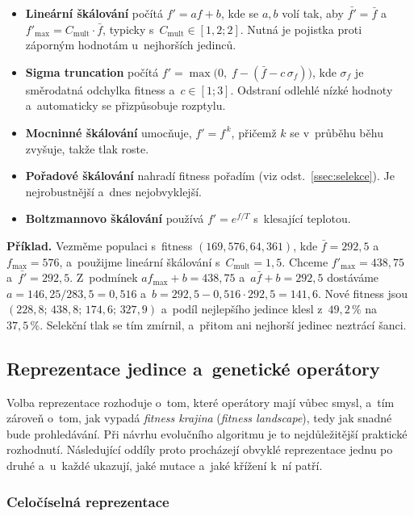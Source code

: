 \documentclass[11pt,a4paper]{article}
\theoremstyle{definition}
\begin{document}
\begin{itemize}
\item \textbf{Lineární škálování} počítá $f' = a f + b$, kde se $a, b$ volí tak,
  aby $\bar{f'} = \bar{f}$ a~$f'_{\max} = C_{\mathrm{mult}} \cdot \bar{f}$,
  typicky s~$C_{\mathrm{mult}} \in [1{,}2; 2]$. Nutná je pojistka proti záporným
  hodnotám u~nejhorších jedinců.
\item \textbf{Sigma truncation} počítá $f' = \max\big(0,\; f - (\bar f - c\,\sigma_f)\big)$,
  kde $\sigma_f$ je směrodatná odchylka fitness a~$c \in [1;3]$. Odstraní
  odlehlé nízké hodnoty a~automaticky se přizpůsobuje rozptylu.
\item \textbf{Mocninné škálování} umocňuje, $f' = f^{\,k}$, přičemž $k$ se
  v~průběhu běhu zvyšuje, takže tlak roste.
\item \textbf{Pořadové škálování} nahradí fitness pořadím (viz
  odst.~\ref{ssec:selekce}). Je nejrobustnější a~dnes nejobvyklejší.
\item \textbf{Boltzmannovo škálování} používá $f' = e^{f/T}$ s~klesající teplotou.
\end{itemize}

\textbf{Příklad.} Vezměme populaci s~fitness $(169, 576, 64, 361)$, kde $\bar f = 292{,}5$
a~$f_{\max} = 576$, a~použijme lineární škálování s~$C_{\mathrm{mult}} = 1{,}5$.
Chceme $f'_{\max} = 438{,}75$ a~$\bar{f'} = 292{,}5$. Z~podmínek
$a f_{\max} + b = 438{,}75$ a~$a \bar f + b = 292{,}5$ dostáváme
$a = 146{,}25/283{,}5 = 0{,}516$ a~$b = 292{,}5 - 0{,}516 \cdot 292{,}5 = 141{,}6$.
Nové fitness jsou $(228{,}8;\, 438{,}8;\, 174{,}6;\, 327{,}9)$ a~podíl nejlepšího jedince
klesl z~$49{,}2\,\%$ na $37{,}5\,\%$. Selekční tlak se tím zmírnil, a~přitom ani nejhorší
jedinec neztrácí šanci.

\subsection{Reprezentace jedince a~genetické operátory}
\label{sec:reprez}

Volba reprezentace rozhoduje o~tom, které operátory mají vůbec smysl, a~tím zároveň
o~tom, jak vypadá \emph{fitness krajina} (\emph{fitness landscape}), tedy jak snadné
bude prohledávání. Při návrhu evolučního algoritmu je to nejdůležitější praktické
rozhodnutí. Následující oddíly proto procházejí obvyklé reprezentace jednu po druhé
a~u~každé ukazují, jaké mutace a~jaké křížení k~ní patří.

\subsubsection{Celočíselná reprezentace}
\end{document}
